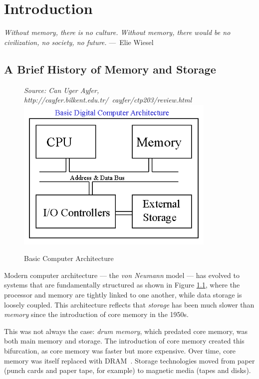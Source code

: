 
\chapter{Introduction}
\label{ch:Introduction}


\begin{epigraph}
    \emph{Without memory, there is no culture. Without memory, there 
    would be no civilization, no society, no future.} ---~Elie Wiesel
\end{epigraph}


\section{A Brief History of Memory and Storage}
\begin{figure}
\centering
\caption{Basic Computer Architecture}\label{figure:computer_architecture}
\emph{Source: Can Uger Ayfer, http://cayfer.bilkent.edu.tr/~cayfer/ctp203/review.html}
\includegraphics[width=0.85\textwidth]{figures/computer-architecture.png}
\end{figure}


Modern computer architecture --- the \textit{von Neumann} model --- has
evolved to systems that are fundamentally structured  as shown in Figure \ref{figure:computer_architecture},
where the processor and memory are tightly linked to one another, while
data storage is loosely coupled.  This architecture reflects that \emph{storage}
has been much slower than \emph{memory} since the introduction of core memory in
the 1950s.

This was not always the case: \emph{drum memory}, which predated core memory,
was both main memory and storage.  The introduction of core memory created
this bifurcation, as core memory was faster but more expensive.  Over time, core
memory was itself replaced with \acs{DRAM}~\cite{US3728695A}.  Storage technologies
moved from paper (punch cards and paper tape, for example) to magnetic media 
(tapes and disks).

